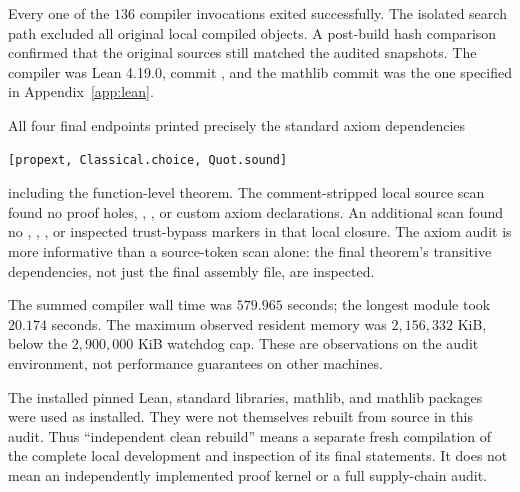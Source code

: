 Every one of the $136$ compiler invocations exited successfully. The isolated search path excluded all original local compiled objects. A post-build hash comparison confirmed that the original sources still matched the audited snapshots. The compiler was Lean 4.19.0, commit , and the mathlib commit was the one specified in Appendix~\ref{app:lean}.

All four final endpoints printed precisely the standard axiom dependencies
\begin{lstlisting}
[propext, Classical.choice, Quot.sound]
\end{lstlisting}
including the function-level theorem. The comment-stripped local source scan found no proof holes, , , or custom axiom declarations. An additional scan found no , , , or inspected trust-bypass markers in that local closure. The axiom audit is more informative than a source-token scan alone: the final theorem's transitive dependencies, not just the final assembly file, are inspected.

The summed compiler wall time was $579.965$ seconds; the longest module took $20.174$ seconds. The maximum observed resident memory was $2{,}156{,}332$ KiB, below the $2{,}900{,}000$ KiB watchdog cap. These are observations on the audit environment, not performance guarantees on other machines.

The installed pinned Lean, standard libraries, mathlib, and mathlib packages were used as installed. They were not themselves rebuilt from source in this audit. Thus ``independent clean rebuild'' means a separate fresh compilation of the complete local development and inspection of its final statements. It does not mean an independently implemented proof kernel or a full supply-chain audit.

